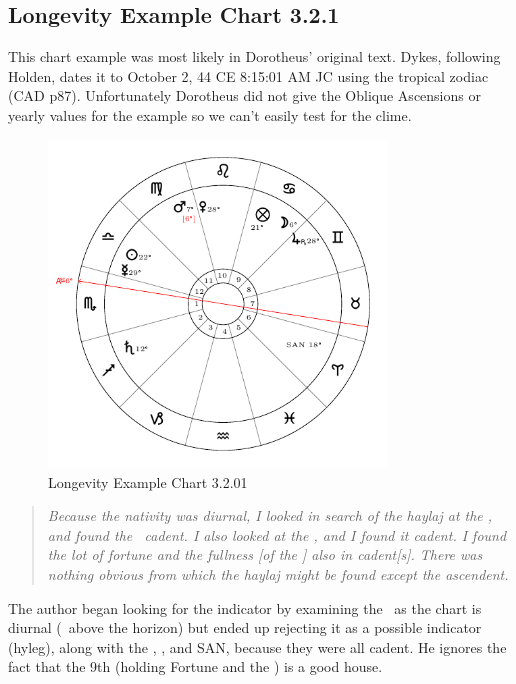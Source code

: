 \subsection{Longevity Example Chart 3.2.1}
\vspace{0.5em}
\begin{mdframed}[backgroundcolor=cyan!5, rightmargin=1em, leftmargin=1em]
This chart example was most likely in Dorotheus' original text. Dykes, following Holden, dates it to October 2, 44 CE 8:15:01 AM JC using the tropical zodiac (CAD p87).  Unfortunately Dorotheus did not give the Oblique Ascensions or yearly values for the example so we can't easily test for the clime.
\end{mdframed}

\begin{figure}[H]
\centering
\includegraphics[width=0.8\textwidth]{charts/3_2_01}
\vspace{-1em}
\caption{Longevity Example Chart 3.2.01}
\end{figure}

\begin{quote}
\textsl{Because the nativity was diurnal, I looked in search of the haylaj at the \Sun, and found the \Sun\, cadent. I also looked at the \Moon, and I found it cadent. I found the lot of fortune and the fullness [of the \Moon] also in cadent[s]. There was nothing obvious from which the haylaj might be found except the ascendent.}
\end{quote}

The author began looking for the indicator by examining the \Sun\, as the chart is diurnal (\Sun\, above the horizon) but ended up rejecting it as a possible indicator (hyleg), along with the \Moon, \Fortune, and SAN, because they were all cadent. He ignores the fact that the 9th (holding Fortune and the \Moon) is a good house.

